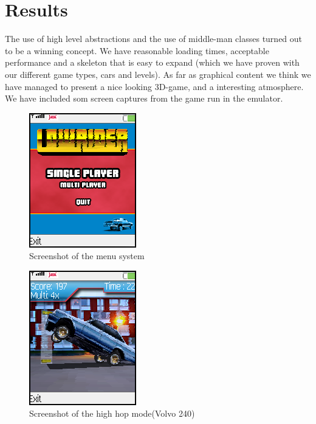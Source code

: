 \documentclass{acmsiggraph}               %
\begin{document}
\section{Results}

The use of high level abstractions and the use of middle-man classes turned out to be a winning concept. We have 
reasonable loading times, acceptable performance and a skeleton that is easy to expand (which we have proven with 
our different game types, cars and levels). 
As far as graphical content we think we have managed to present a nice looking 3D-game, and a interesting 
atmosphere. We have included som screen captures from the game run in the emulator.

\begin{figure}[tb]
    \centering
    \includegraphics[width=0.6\columnwidth]{bild1-meny.png}
    \caption{Screenshot of the menu system}
    \label{fig_bild1}
\end{figure}

\begin{figure}[tb]
    \centering
    \includegraphics[width=0.6\columnwidth]{bild2-cardance.png}
    \caption{Screenshot of the high hop mode(Volvo 240)}
    \label{fig_bild2}
\end{figure}
\end{document}
